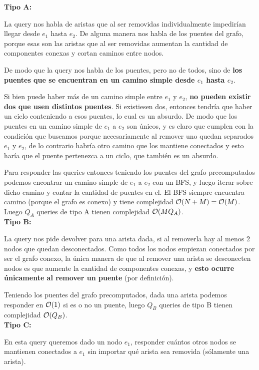 \textbf{Tipo A:}

La query nos habla de aristas que al ser removidas individualmente 
impedirían llegar desde $e_1$ hasta $e_2$. De alguna manera nos habla de los puentes 
del grafo, porque esas son las aristas que al ser removidas aumentan la cantidad de 
componentes conexas y cortan caminos entre nodos. 

De modo que la query nos habla de los 
puentes, pero no de todos, sino de \textbf{los puentes que se encuentran 
en un camino simple desde $e_1$ hasta $e_2$}. 

Si bien puede haber más de un camino simple entre $e_1$ y $e_2$, \textbf{no pueden 
existir dos que usen distintos puentes}. Si existiesen dos, entonces 
tendría que haber un ciclo conteniendo a esos puentes, lo cual es un absurdo. 
De modo que los puentes en un camino simple de $e_1$ a $e_2$ son únicos, y es 
claro que cumplen con la condición que buscamos porque necesariamente al remover 
uno quedan separados $e_1$ y $e_2$, de lo contrario habría otro camino que los 
mantiene conectados y esto haría que el puente pertenezca a un ciclo, que también 
es un absurdo. 

Para responder las queries entonces teniendo los puentes del grafo precomputados 
podemos encontrar un camino simple de $e_1$ a $e_2$ con un BFS, y luego 
iterar sobre dicho camino y contar la cantidad de puentes en el. El BFS 
siempre encuentra camino (porque el grafo es conexo) y tiene complejidad 
$\mathcal{O}(N+M) = \mathcal{O}(M)$. Luego $Q_A$ queries de tipo A tienen complejidad 
$\mathcal{O}(MQ_A)$. \\

\textbf{Tipo B:}

La query nos pide devolver para una arista dada, si al 
removerla hay al menos 2 nodos que quedan desconectados. Como todos 
los nodos empiezan conectados por ser el grafo conexo, la única manera de que 
al remover una arista se desconecten nodos es que aumente la cantidad de componentes 
conexas, y \textbf{esto ocurre únicamente al remover un puente} (por definición). 

Teniendo los puentes del grafo precomputados, dada una arista podemos responder 
en $\mathcal{O}(1)$ si es o no un puente, luego $Q_B$ queries de tipo B tienen complejidad 
$\mathcal{O}(Q_B)$. \\

\textbf{Tipo C:}

En esta query queremos dado un nodo $e_1$, responder cuántos otros nodos 
se mantienen conectados a $e_1$ sin importar qué arista sea removida (sólamente una arista). 

